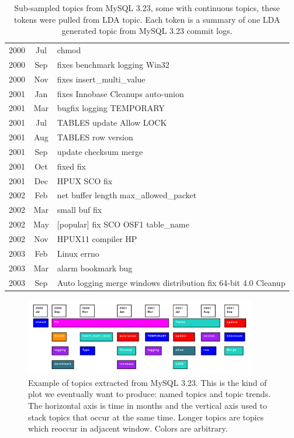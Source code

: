 \documentclass[times, 10pt,twocolumn]{article}
\begin{document}
\begin{table}
\centering
\begin{tabular}{|cc|l|}
\hline
2000 &  Jul &      chmod \\
2000 &  Sep &      fixes benchmark logging Win32 \\
2000 &  Nov &      fixes insert\_multi\_value \\
2001 &  Jan &      fixes Innobase Cleanups auto-union \\
2001 &  Mar &      bugfix logging  TEMPORARY  \\
\hline         
2001 &  Jul &      TABLES update Allow LOCK \\ 
               
2001 &  Aug &      TABLES row version \\
\hline         
2001 &  Sep &      update checksum merge \\
2001 &  Oct &      fixed fix \\
2001 &  Dec &      HPUX SCO fix \\
\hline         
2002 &  Feb &      net buffer length  max\_allowed\_packet \\
2002 &  Mar &      small buf fix  \\
\hline         
2002 &  May &      [popular] fix SCO OSF1 table\_name \\
2002 &  Nov &      HPUX11 compiler HP \\
\hline         
2003 &  Feb &      Linux errno   \\
2003 &  Mar &      alarm bookmark bug \\
\hline         
2003 &  Sep &      Auto logging merge windows distribution fix 64-bit 4.0 Cleanup \\
\hline
\end{tabular}
\caption{Sub-sampled topics from MySQL 3.23, some with continuous topics, these tokens were pulled from LDA topic. Each token is a summary of one LDA generated topic from MySQL 3.23 commit logs.}
\label{tab:portability}
\end{table}



\begin{figure}
  \centering
  \includegraphics[width=0.9\textwidth]{lda}
  \caption{Example of topics extracted from MySQL 3.23. This is the kind of plot we eventually want to produce: named topics and topic trends. The horizontal axis is time in months and the vertical axis used to stack topics that occur at the same time. Longer topics are topics which reoccur in adjacent window. Colors are arbitrary.}
  \label{fig:lda}
\end{figure}
\end{document}
